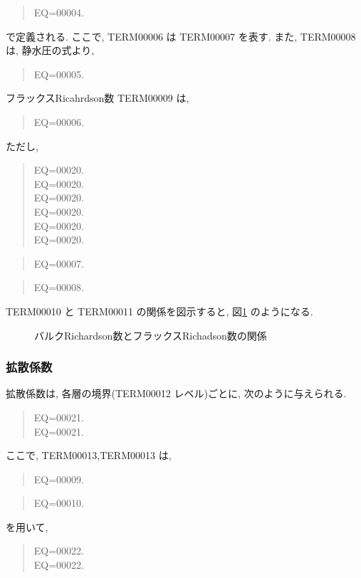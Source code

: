 \begin{quote}
EQ=00004.
\end{quote}
で定義される.
ここで, TERM00006 は TERM00007 を表す.
また, TERM00008 は, 静水圧の式より,
\begin{quote}
EQ=00005.
\end{quote}

フラックスRicahrdson数 TERM00009 は,

\begin{quote}
EQ=00006.
\end{quote}
ただし, 

\begin{quote}
EQ=00020.\\
EQ=00020.\\
EQ=00020.\\
EQ=00020.\\
EQ=00020.\\
EQ=00020.
\end{quote}
\begin{quote}
EQ=00007.
\end{quote}

\begin{quote}
EQ=00008.
\end{quote}

TERM00010 と TERM00011 の関係を図示すると,
図\ref{p-dif:rib-rif} のようになる.

\begin{figure}[htbp]
  \begin{center}
    \caption{バルクRichardson数とフラックスRichadson数の関係}
    \label{p-dif:rib-rif}
  \end{center}
\end{figure}

\subsubsection{拡散係数}

拡散係数は,
各層の境界(TERM00012 レベル)ごとに,
次のように与えられる.

\begin{quote}
EQ=00021.\\
EQ=00021.
\end{quote}

ここで, TERM00013,TERM00013 は,
\begin{quote}
EQ=00009.
\end{quote}
%
\begin{quote}
EQ=00010.
\end{quote}
を用いて,
\begin{quote}
EQ=00022.\\
EQ=00022.
\end{quote} 

